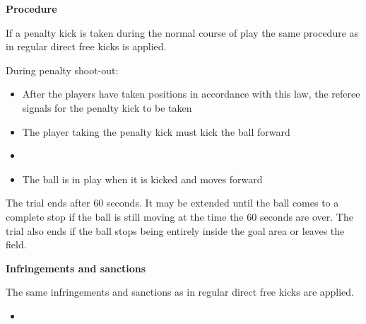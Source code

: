 \bigskip

{\bfseries Procedure}

\headlinebox

If a penalty kick is taken during the normal course of play the same procedure
as in regular direct free kicks is applied.

\bigskip
During penalty shoot-out:
\begin{itemize}
\item After the players have taken positions in accordance with this law,
      the referee signals for the penalty kick to be taken
\item The player taking the penalty kick must kick the ball forward
\item {}
\item The ball is in play when it is kicked and moves forward 
\end{itemize}


\bigskip

The trial ends after 60 seconds.
It may be extended until the ball comes to a complete stop if the ball is still
moving at the time the 60 seconds are over.
The trial also ends if the ball stops being entirely inside the goal area or
leaves the field.

\bigskip


\bigskip

{\bfseries Infringements and sanctions }

\headlinebox

The same infringements and sanctions as in regular direct free kicks are applied.

\bigskip

\begin{itemize}
\item {}
\end{itemize}

